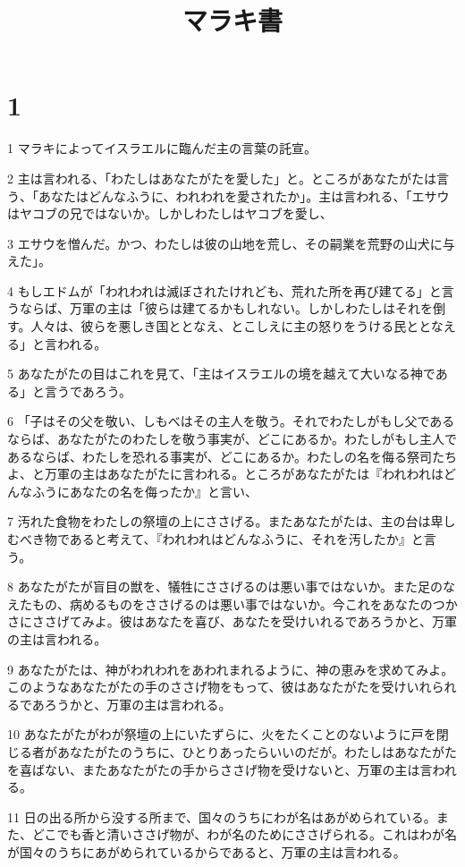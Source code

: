 

\title{マラキ書}


\chapter{1}

\par 1 マラキによってイスラエルに臨んだ主の言葉の託宣。
\par 2 主は言われる、「わたしはあなたがたを愛した」と。ところがあなたがたは言う、「あなたはどんなふうに、われわれを愛されたか」。主は言われる、「エサウはヤコブの兄ではないか。しかしわたしはヤコブを愛し、
\par 3 エサウを憎んだ。かつ、わたしは彼の山地を荒し、その嗣業を荒野の山犬に与えた」。
\par 4 もしエドムが「われわれは滅ぼされたけれども、荒れた所を再び建てる」と言うならば、万軍の主は「彼らは建てるかもしれない。しかしわたしはそれを倒す。人々は、彼らを悪しき国ととなえ、とこしえに主の怒りをうける民ととなえる」と言われる。
\par 5 あなたがたの目はこれを見て、「主はイスラエルの境を越えて大いなる神である」と言うであろう。
\par 6 「子はその父を敬い、しもべはその主人を敬う。それでわたしがもし父であるならば、あなたがたのわたしを敬う事実が、どこにあるか。わたしがもし主人であるならば、わたしを恐れる事実が、どこにあるか。わたしの名を侮る祭司たちよ、と万軍の主はあなたがたに言われる。ところがあなたがたは『われわれはどんなふうにあなたの名を侮ったか』と言い、
\par 7 汚れた食物をわたしの祭壇の上にささげる。またあなたがたは、主の台は卑しむべき物であると考えて、『われわれはどんなふうに、それを汚したか』と言う。
\par 8 あなたがたが盲目の獣を、犠牲にささげるのは悪い事ではないか。また足のなえたもの、病めるものをささげるのは悪い事ではないか。今これをあなたのつかさにささげてみよ。彼はあなたを喜び、あなたを受けいれるであろうかと、万軍の主は言われる。
\par 9 あなたがたは、神がわれわれをあわれまれるように、神の恵みを求めてみよ。このようなあなたがたの手のささげ物をもって、彼はあなたがたを受けいれられるであろうかと、万軍の主は言われる。
\par 10 あなたがたがわが祭壇の上にいたずらに、火をたくことのないように戸を閉じる者があなたがたのうちに、ひとりあったらいいのだが。わたしはあなたがたを喜ばない、またあなたがたの手からささげ物を受けないと、万軍の主は言われる。
\par 11 日の出る所から没する所まで、国々のうちにわが名はあがめられている。また、どこでも香と清いささげ物が、わが名のためにささげられる。これはわが名が国々のうちにあがめられているからであると、万軍の主は言われる。
